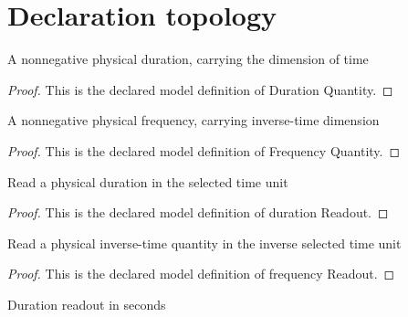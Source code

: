 \section{Declaration topology}
\begin{definition}
  \label{def:physics:phyx-mini-0649:phyxminiproblems-problemphyxmini0649-durationquantity}
  A nonnegative physical duration, carrying the dimension of time
\end{definition}
\begin{proof}
  This is the declared model definition of Duration Quantity.
\end{proof}
\begin{definition}
  \label{def:physics:phyx-mini-0649:phyxminiproblems-problemphyxmini0649-frequencyquantity}
  A nonnegative physical frequency, carrying inverse-time dimension
\end{definition}
\begin{proof}
  This is the declared model definition of Frequency Quantity.
\end{proof}
\begin{definition}
  \label{def:physics:phyx-mini-0649:phyxminiproblems-problemphyxmini0649-durationreadout}
  Read a physical duration in the selected time unit
\end{definition}
\begin{proof}
  This is the declared model definition of duration Readout.
\end{proof}
\begin{definition}
  \label{def:physics:phyx-mini-0649:phyxminiproblems-problemphyxmini0649-frequencyreadout}
  Read a physical inverse-time quantity in the inverse selected time unit
\end{definition}
\begin{proof}
  This is the declared model definition of frequency Readout.
\end{proof}
\begin{definition}
  \label{def:physics:phyx-mini-0649:phyxminiproblems-problemphyxmini0649-durationinseconds}
  Duration readout in seconds
\end{definition}
